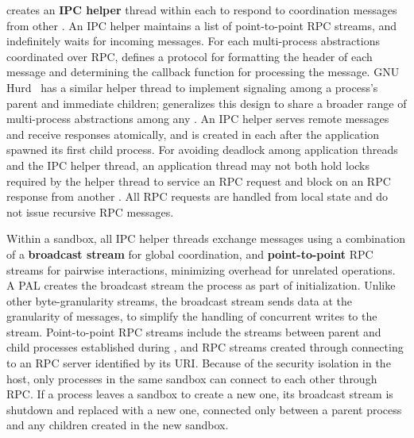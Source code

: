 \thelibos{} creates an {\bf IPC helper} thread within each \picoproc{}
to respond to coordination messages from other \picoprocs{}. 
An IPC helper
maintains a list of point-to-point RPC streams, and indefinitely waits for incoming messages.
For each multi-process abstractions coordinated over RPC,
\thelibos{} defines a protocol for formatting the header of each message
and determining the callback function for processing the message.
GNU Hurd~\cite{hurd} has a similar helper thread to implement signaling among a process's parent and
immediate children;
\graphene{} generalizes this design to share a broader range of multi-process abstractions among any \picoprocs{}.
An IPC helper serves remote messages and receive responses atomically,
and is created in each \picoproc{}
after the application spawned its first child process.
For avoiding deadlock among application threads and the IPC helper thread, 
an application thread may not both hold locks required by the helper thread to service an RPC request
and block on an RPC response from another \picoproc{}.
All RPC requests are handled from local state and do not issue recursive RPC messages.%

Within a sandbox, all IPC helper threads exchange messages using a
combination of
a {\bf broadcast stream} for global coordination,
and {\bf point-to-point} RPC streams for pairwise interactions, 
minimizing overhead for unrelated operations.
A PAL creates the broadcast stream the process as part of initialization.
Unlike other byte-granularity streams, the broadcast stream sends data at the granularity of messages,
to simplify the handling of concurrent writes to the stream.
Point-to-point RPC streams include the streams between parent and child processes established during ,
and RPC streams created through connecting to an RPC server
identified by its URI.
Because of the security isolation in the host,
only processes in the same sandbox can connect to each other through RPC.
If a process leaves a sandbox to create a new one,
its broadcast stream is shutdown and replaced
with a new one, connected only between a parent process and any children created in the
new sandbox.

